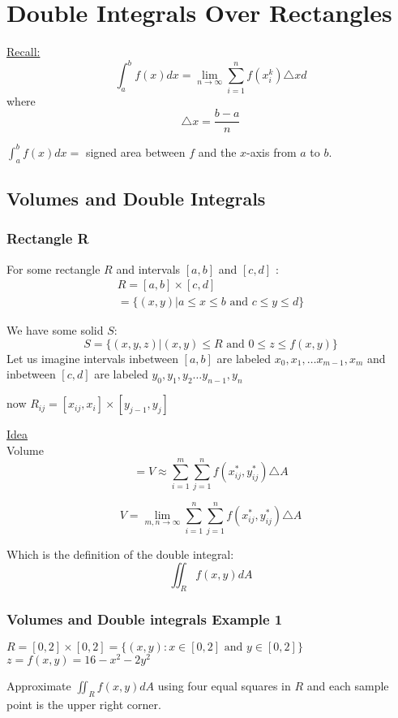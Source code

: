 \documentclass[12pt]{article}
\begin{document}
\section{Double Integrals Over Rectangles}
\underline{Recall:} 
\[\int_{a}^{b} f(x)dx = \lim_{n \to \infty} \sum_{i=1}^{n} f(x_i^k)\triangle xd\] 
where 
\[\triangle x = \frac{b-a}{n}\]

\(\int_{a}^{b} f(x)dx = \) signed area between \(f\) and the \(x\)-axis from \(a\) to \(b\).

\subsection{Volumes and Double Integrals}
\subsubsection{Rectangle R}
For some rectangle \(R\) and intervals \([a,b]\) and \([c,d]\) :
\begin{align*}
	\label{eq:Volume on interval}
	R = [a,b] \times  [c,d]\\
	 = \{(x,y)|a \leq x \leq b \text{ and } c \leq y \leq d\}
\end{align*}

We have some solid \(S\):
\[
	S = \{(x,y,z)|(x,y) \leq R \text{ and } 0 \leq z \leq f(x,y)\}
\]
Let us imagine intervals inbetween \([a,b]\) are labeled \(x_0,x_1, \hdots x_{m-1}, x_m\) and inbetween \([c,d]\) are labeled \(y_0, y_1, y_2 \hdots y_{n-1}, y_n\)

now \(R_{ij} = [x_{ij},x_i] \times [y_{j-1},y_j] \) 

\underline{Idea}\\
Volume \[ = V \approx \sum_{i=1}^{m} \sum_{j=1}^{n} f(x_{ij} ^ *, y_{ij}^*) \triangle A\]

\[
	V = \lim_{m,n \to \infty} \sum_{i=1}^{n} \sum_{j=1}^{n} f(x_{ij}^*, y_{ij}^*) \triangle A
\]

Which is the definition of the double integral: 
\[\iint_{R}f(x,y)dA\]

\subsubsection{Volumes and Double integrals Example 1}
\(R = [0,2] \times [0,2] = \{(x,y): x\in[0,2] \text{ and } y \in [0,2]\}\)  \\
\(z = f(x,y) = 16 - x^2 - 2y^2\)

Approximate \(\iint_{R}f(x,y)dA\) using four equal squares in \(R\) and each sample point is the upper right corner.
\end{document}
